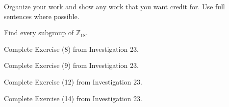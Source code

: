 \documentclass[addpoints]{exam}
\begin{document}
Organize your work and show any work that you want credit for. Use full sentences where possible.

\begin{questions}
\question 
Find every subgroup of $\mathbb{Z}_{18}$.

\question 
Complete Exercise (8) from Investigation 23. 

\question 
Complete Exercise (9) from Investigation 23. 


\question
Complete Exercise (12) from Investigation 23. 

\question
Complete Exercise (14) from Investigation 23. 







\end{questions}
\end{document}
